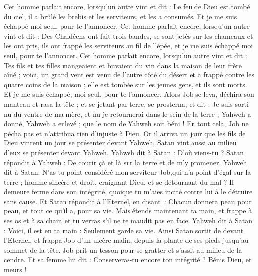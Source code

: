 \begin{multicols}{2}
Cet homme parlait encore, lorsqu'un autre vint et dit : Le feu de Dieu est tombé du ciel, il a brûlé les brebis et les serviteurs, et les a consumés. Et je me suis échappé moi seul, pour te l'annoncer.
Cet homme parlait encore, lorsqu'un autre vint et dit : Des Chaldéens ont fait trois bandes, se sont jetés sur les chameaux et les ont pris, ils ont frappé les serviteurs au fil de l'épée, et je me suis échappé moi seul, pour te l'annoncer.
Cet homme parlait encore, lorsqu'un autre vint et dit : Tes fils et tes filles mangeaient et buvaient du vin dans la maison de leur frère aîné ;
voici, un grand vent est venu de l'autre côté du désert et a frappé contre les quatre coins de la maison ; elle est tombée sur les jeunes gens, et ils sont morts. Et je me suis échappé, moi seul, pour te l'annoncer.
Alors Job se leva, déchira son manteau et  rasa la tête ; et se jetant par terre, se prosterna,
et dit : Je suis sorti nu du ventre de ma mère, et nu je retournerai dans le sein de la terre ; Yahweh a donné, Yahweh a enlevé ; que le nom de Yahweh soit béni !
En tout cela, Job ne pécha pas et n'attribua rien d'injuste à Dieu.
\VerseOne{}Or il arriva un jour que les fils de Dieu vinrent un jour se présenter devant Yahweh, Satan vint aussi au milieu d'eux se présenter devant Yahweh.
Yahweh dit à Satan : D'où viens-tu ? Satan répondit à Yahweh : De courir çà et là sur la terre et de m'y promener.
Yahweh dit à Satan: N'as-tu point considéré mon serviteur Job,qui n'a point d'égal sur la terre ; homme sincère et droit, craignant Dieu, et se détournant du mal ? Il demeure ferme dans son intégrité, quoique tu m'aies incité contre lui à le détruire sans cause.
Et Satan répondit à l’Eternel, en disant : Chacun donnera peau pour peau, et tout ce qu’il a, pour sa vie.
Mais étends maintenant ta main, et frappe à ses os et à sa chair, et tu verras s'il ne te maudit pas en face. 
Yahweh dit à Satan : Voici, il est en ta main : Seulement garde sa vie.
Ainsi Satan sortit de devant l’Eternel, et frappa Job d’un ulcère malin, depuis la plante de ses pieds jusqu’au sommet de la tête.
Job prit un tesson pour se gratter et s'assit au milieu de la cendre.
Et sa femme lui dit : Conserveras-tu encore ton intégrité ?  Bénis Dieu, et meurs !

\end{multicols}
